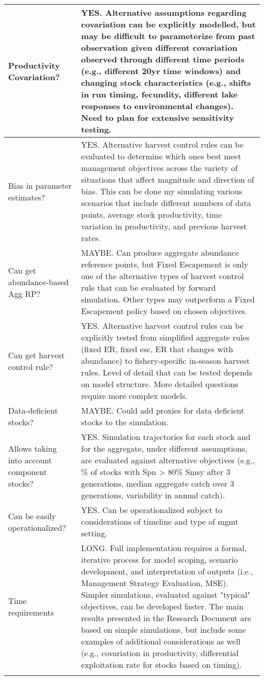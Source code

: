 \documentclass[french,11pt]{book}
\begin{document}
\begin{longtable}[t]{>{\raggedright\arraybackslash}p{7em}>{\raggedright\arraybackslash}p{40em}}
\midrule Productivity Covariation? & YES. Alternative assumptions regarding covariation can be explicitly modelled, but may be difficult to parameterize from past observation given different covariation observed through different time periods (e.g., different 20yr time windows) and changing stock characteristics (e.g., shifts in run timing, fecundity, different lake responses to environmental changes). Need to plan for extensive sensitivity testing.\\
\midrule Bias in parameter estimates? & YES. Alternative harvest control rules can be evaluated to determine which ones best meet management objectives across the variety of situations that affect magnitude and direction of bias. This can be done my simulating various scenarios that include different numbers of data points, average stock productivity, time variation in productivity, and previous harvest rates.\\
\midrule Can get abundance-based Agg RP? & MAYBE. Can produce aggregate abundance reference points, but Fixed Escapement is only one of the alternative types of harvest control rule that can be evaluated by forward simulation. Other types may outperform a Fixed Escapement policy based on chosen objectives.\\
\midrule Can get harvest control rule? & YES. Alternative  harvest control rules can be explicitly tested from simplified aggregate rules (fixed ER, fixed esc, ER that changes with abundance) to fishery-specific in-season harvest rules. Level of detail that can be tested depends on model structure. More detailed questions require more complex models.\\
\midrule Data-deficient stocks? & MAYBE. Could add proxies for data deficient stocks to the simulation.\\
\midrule Allows taking into account component stocks? & YES. Simulation trajectories for each stock and for the aggregate, under different assumptions, are evaluated against alternative objectives (e.g., \% of stocks with Spn > 80\% Smsy after 3 generations, median aggregate catch over 3 generations, variability in annual catch).\\
\midrule Can be easily operationalized? & YES. Can be operationalized subject to considerations of timeline and type of mgmt setting.\\
\midrule Time requirements & LONG. Full implementation requires a formal, iterative process for model scoping, scenario development, and interpretation of outputs (i.e., Management Strategy Evaluation, MSE). Simpler simulations, evaluated against "typical" objectives, can be developed faster. The main results presented in the Research Document are based on simple simulations, but include some examples of additional considerations as well (e.g., covariation in productivity, differential exploitation rate for stocks based on timing).\\* \end{longtable}
\end{document}
